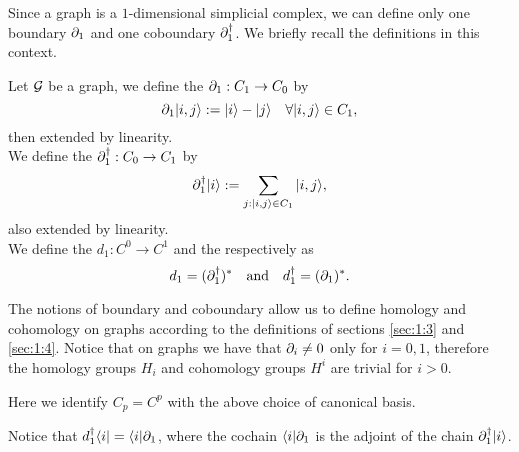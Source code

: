 \documentclass[../2.tex]{subfiles}
\begin{document}
    
    Since a graph is a $1$-dimensional simplicial complex, we can define only one boundary $\partial_1$ and one coboundary $\partial_1^\dagger$.
    We briefly recall the definitions in this context.

    \begin{defn}
        Let $\mathcal{G}$ be a graph, we define the  $\partial_1 : C_1 \to C_0$ by 
        \[ \partial_1| i,j \rangle := | i \rangle - | j \rangle \quad \forall | i,j \rangle \in C_1,\]
        then extended by linearity.\\
        We define the  $\partial^\dagger_1 : C_0 \to C_1$ by 
        \[ \partial^\dagger_1| i \rangle := \sum_{j : | i,j \rangle \in C_1} | i,j \rangle,\]
        also extended by linearity.\\
        We define the  $d_1 : C^0 \to C^1$ and the  respectively as
        \[ d_1 = (\partial_1^\dagger)^* \quad \text{and} \quad d_1^\dagger = (\partial_1)^* .\]
        \label{def:2:2:2}
    \end{defn}

    The notions of boundary and coboundary allow us to define homology and cohomology on graphs according to the definitions of sections \ref{sec:1:3} and \ref{sec:1:4}.
    Notice that on graphs we have that $\partial_i \neq 0$ only for $i = 0,1$, therefore the homology groups $H_i$ and cohomology groups $H^i$ are trivial for $i > 0$.

    Here we identify $C_p = C^p$ with the above choice of
    canonical basis.

    Notice that $d_1^\dagger \langle i | = \langle i |\partial_1$,
    where the cochain $\langle i |\partial_1$ is the adjoint of the chain $\partial_1^\dagger| i \rangle$.





\end{document}
